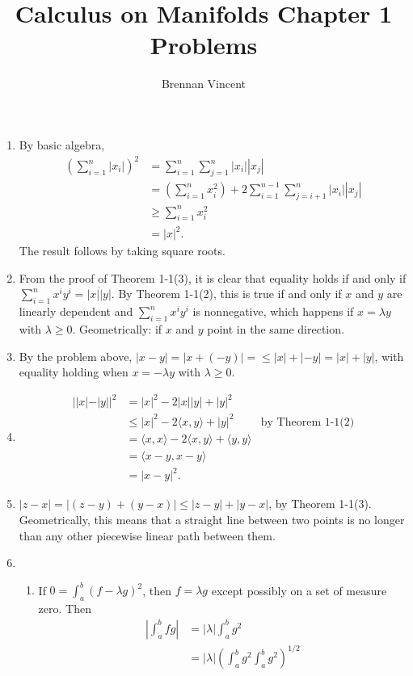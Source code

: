 \documentclass{article}
\title{Calculus on Manifolds Chapter 1 Problems}
\author{Brennan Vincent}
\begin{document}
\maketitle
\begin{enumerate}[label=\textbf{1-\arabic*.}]
\item By basic algebra,
\begin{align*}
	\left(\sum_{i=1}^n|x_i|\right)^2 &= \sum_{i=1}^n\sum_{j=1}^n|x_i||x_j|\\
		&= \left(\sum_{i=1}^n x_i^2\right) + 2\sum_{i=1}^{n-1}\sum_{j=i+1}^n |x_i||x_j|\\
		&\geq \sum_{i=1}^n x_i^2\\
		&= |x|^2.
\end{align*}
The result follows by taking square roots.
\item
	From the proof of Theorem 1-1(3), it is clear that equality holds if and only if $\sum_{i=1}^n x^i y^i = |x|\dot|y|$. By Theorem 1-1(2), this is true if and only if $x$ and $y$ are linearly dependent and $\sum_{i=1}^n x^i y^i$ is nonnegative, which happens if $x=\lambda y$ with $\lambda \geq 0$. Geometrically: if $x$ and $y$ point in the same direction.
\item By the problem above, $|x-y|=|x+(-y)|=\leq |x| + |-y| = |x| + |y|$, with equality holding when $x=-\lambda y$ with $\lambda \geq 0$.
\item
\begin{align*}
||x|-|y||^2 &= |x|^2-2|x||y|+|y|^2\\
	&\leq |x|^2 - 2\langle x,y\rangle + |y|^2 &\text{by Theorem 1-1(2)}\\
	&= \langle x,x\rangle - 2\langle x,y\rangle + \langle y,y\rangle\\
	&= \langle x-y,x-y\rangle\\
	&= |x-y|^2.
\end{align*}
\item $|z-x| = |(z-y) + (y - x)| \leq |z-y|+|y-x|$, by Theorem 1-1(3). Geometrically, this means that a straight line between two points is no longer than any other piecewise linear path between them.
\item
\begin{enumerate}
\item If $0=\int_a^b (f-\lambda g)^2$, then $f=\lambda g$ except possibly on a set of measure zero. Then 
\begin{align*}
\left|\int_a^b fg\right| &= \left|\lambda\right|\int_a^b g^2\\
	&= \left|\lambda\right|\left(\int_a^b g^2 \int_a^b g^2\right)^{1/2}\\

\end{align*}
\end{enumerate}
\end{enumerate}
\end{document}

